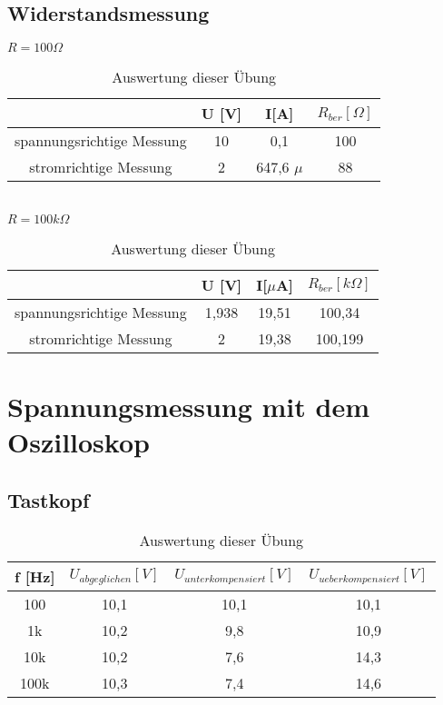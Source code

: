 \subsection{Widerstandsmessung}

$R=100 \Omega$ \\
\begin{table}[h]
	\centering
	\begin{tabular}{|c|c|c|c|}
	\hline 
						& U [V]	& I[A]			& $R_{ber} [\Omega]$		\\ 
	\hline 
	spannungsrichtige Messung	& 10		& 0,1			& 100		\\ 
	\hline 
	stromrichtige Messung		& 2		& 647,6 $\mu$	& 88		\\ 
	\hline 
	\end{tabular}
	\caption{Auswertung dieser Übung}
\end{table}

~\\
$R=100 k\Omega$ \\
\begin{table}[h]
	\centering
	\begin{tabular}{|c|c|c|c|}
	\hline 
						& U [V]	& I[$\mu$A]		& $R_{ber} [k\Omega]$		\\ 
	\hline 
	spannungsrichtige Messung	& 1,938	& 19,51		& 100,34		\\ 
	\hline 
	stromrichtige Messung		& 2		& 19,38		& 100,199		\\ 
	\hline 
	\end{tabular}
	\caption{Auswertung dieser Übung}
\end{table}


\newpage

\section{Spannungsmessung mit dem Oszilloskop}
\subsection{Tastkopf}


\begin{table}[h]
	\centering
	\begin{tabular}{|c|c|c|c|}
	\hline 
	f [Hz]		& $U_{abgeglichen} [V]$	& $U_{unterkompensiert} [V]$	& $U_{ueberkompensiert} [V]$		\\ 
	\hline 
	100		& 10,1			& 10,1				& 10,1		\\ 
	\hline 
	1k		& 10,2			& 9,8					& 10,9		\\ 
	\hline 
	10k		& 10,2			& 7,6					& 14,3		\\ 
	\hline 
	100k		& 10,3			& 7,4					& 14,6		\\ 
	\hline 
	\end{tabular}
	\caption{Auswertung dieser Übung}
\end{table}



